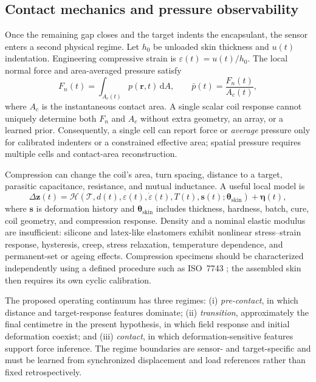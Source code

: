 \documentclass[10pt]{article}
\begin{document}
\subsection{Contact mechanics and pressure observability}
Once the remaining gap closes and the target indents the encapsulant, the sensor enters a second physical regime. Let $h_0$ be unloaded skin thickness and $u(t)$ indentation. Engineering compressive strain is $\varepsilon(t)=u(t)/h_0$. The local normal force and area-averaged pressure satisfy
\begin{equation}
F_n(t)=\int_{A_c(t)}p(\mathbf{r},t)\,\mathrm{d}A,\qquad \bar p(t)=\frac{F_n(t)}{A_c(t)},
\label{eq:pressure}
\end{equation}
where $A_c$ is the instantaneous contact area. A single scalar coil response cannot uniquely determine both $F_n$ and $A_c$ without extra geometry, an array, or a learned prior. Consequently, a single cell can report force or \emph{average} pressure only for calibrated indenters or a constrained effective area; spatial pressure requires multiple cells and contact-area reconstruction.

Compression can change the coil's area, turn spacing, distance to a target, parasitic capacitance, resistance, and mutual inductance. A useful local model is
\begin{equation}
\Delta\mathbf{z}(t)=\mathcal{H}\!\left(\mathcal{T},d(t),\varepsilon(t),\dot\varepsilon(t),T(t),\mathbf{s}(t);\boldsymbol\theta_{\mathrm{skin}}\right)+\boldsymbol\eta(t),
\label{eq:contactmodel}
\end{equation}
where $\mathbf{s}$ is deformation history and $\boldsymbol\theta_{\mathrm{skin}}$ includes thickness, hardness, batch, cure, coil geometry, and compression response. Density and a nominal elastic modulus are insufficient: silicone and latex-like elastomers exhibit nonlinear stress--strain response, hysteresis, creep, stress relaxation, temperature dependence, and permanent-set or ageing effects. Compression specimens should be characterized independently using a defined procedure such as ISO~7743 \citep{iso7743}; the assembled skin then requires its own cyclic calibration.

The proposed operating continuum has three regimes: (i) \emph{pre-contact}, in which distance and target-response features dominate; (ii) \emph{transition}, approximately the final centimetre in the present hypothesis, in which field response and initial deformation coexist; and (iii) \emph{contact}, in which deformation-sensitive features support force inference. The regime boundaries are sensor- and target-specific and must be learned from synchronized displacement and load references rather than fixed retrospectively.
\end{document}
